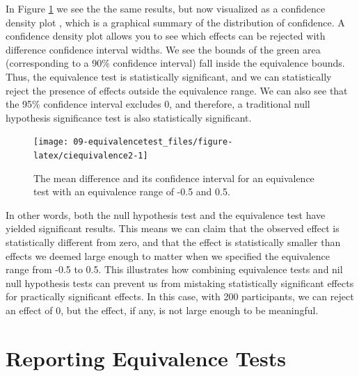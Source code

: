 \documentclass[
  oneside]{krantz}
\begin{document}
In Figure \ref{fig:ciequivalence2} we see the the same results, but now visualized as a confidence density plot \citep{schweder_confidence_2016}, which is a graphical summary of the distribution of confidence. A confidence density plot allows you to see which effects can be rejected with difference confidence interval widths. We see the bounds of the green area (corresponding to a 90\% confidence interval) fall inside the equivalence bounds. Thus, the equivalence test is statistically significant, and we can statistically reject the presence of effects outside the equivalence range. We can also see that the 95\% confidence interval excludes 0, and therefore, a traditional null hypothesis significance test is also statistically significant.



\begin{figure}

{\centering \texttt{[image: 09-equivalencetest\_files/figure-latex/ciequivalence2-1]} 

}

\caption{The mean difference and its confidence interval for an equivalence test with an equivalence range of -0.5 and 0.5.}\label{fig:ciequivalence2}
\end{figure}

In other words, both the null hypothesis test and the equivalence test have yielded significant results. This means we can claim that the observed effect is statistically different from zero, and that the effect is statistically smaller than effects we deemed large enough to matter when we specified the equivalence range from -0.5 to 0.5. This illustrates how combining equivalence tests and nil null hypothesis tests can prevent us from mistaking statistically significant effects for practically significant effects. In this case, with 200 participants, we can reject an effect of 0, but the effect, if any, is not large enough to be meaningful.

\hypertarget{reporting-equivalence-tests}{%
\section{Reporting Equivalence Tests}\label{reporting-equivalence-tests}}
\end{document}
